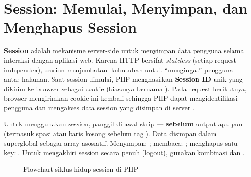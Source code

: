 ﻿\section{Session: Memulai, Menyimpan, dan Menghapus Session}

\textbf{Session} adalah mekanisme server-side untuk menyimpan data pengguna selama interaksi dengan aplikasi web. Karena HTTP bersifat \textit{stateless} (setiap request independen), session menjembatani kebutuhan untuk ``mengingat'' pengguna antar halaman. Saat session dimulai, PHP menghasilkan \textbf{Session ID} unik yang dikirim ke browser sebagai cookie (biasanya bernama ). Pada request berikutnya, browser mengirimkan cookie ini kembali sehingga PHP dapat mengidentifikasi pengguna dan mengakses data session yang disimpan di server \cite{phpManual}.

Untuk menggunakan session, panggil  di awal skrip --- \textbf{sebelum} output apa pun (termasuk spasi atau baris kosong sebelum tag ). Data disimpan dalam superglobal  sebagai array asosiatif. Menyimpan: ; membaca: ; menghapus satu key: . Untuk mengakhiri session secara penuh (logout), gunakan kombinasi  dan  \cite{phpRightWay}.

\begin{figure}[H]
\centering
{}
\caption{Flowchart siklus hidup session di PHP}
\end{figure}

